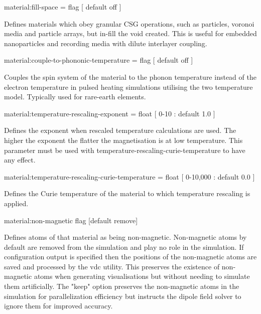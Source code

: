 {\zicf material:fill-space = flag [ default off ]} Defines materials which obey granular CSG operations, such as particles, voronoi media and particle arrays, but in-fill the void created. This is useful for embedded nanoparticles and recording media with dilute interlayer coupling.

{\zicf material:couple-to-phononic-temperature = flag [ default off ]} Couples the spin system of the material to the phonon temperature instead of the electron temperature in pulsed heating simulations utilising the two temperature model. Typically used for rare-earth elements.

{\zicf material:temperature-rescaling-exponent = float [ 0-10 : default 1.0 ]} Defines the exponent when rescaled temperature calculations are used. The higher the exponent the flatter the magnetisation is at low temperature. This parameter must be used with temperature-rescaling-curie-temperature to have any effect.

{\zicf material:temperature-rescaling-curie-temperature = float [ 0-10,000 : default 0.0 ]} Defines the Curie temperature of the material to which temperature rescaling is applied.

{\zicf material:non-magnetic flag [default remove]} Defines atoms of
that material as being non-magnetic. Non-magnetic atoms by default are removed from the simulation and play no role in the simulation. If configuration output is specified then the positions of the non-magnetic atoms are saved and processed by the vdc utility. This preserves the existence of non-magnetic atoms when generating visualisations but without needing to simulate them artificially. The "keep" option preserves the non-magnetic atoms in the simulation for parallelization efficiency but instructs the dipole field solver to ignore them for improved accuracy.


